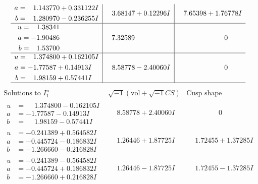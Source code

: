 \documentclass[1p]{elsarticle_modified}
\theoremstyle{definition}
\newcommand{\I}{\sqrt{-1}}
\begin{document}
$$\begin{array}{c|c|c}
\begin{aligned}
a &= \phantom{-}1.143770 + 0.331122 I \\
b &= \phantom{-}1.280970 - 0.236255 I\end{aligned}
 & \phantom{-}3.68147 + 0.12296 I & \phantom{-}7.65398 + 1.76778 I \\ \hline\begin{aligned}
u &= \phantom{-}1.38341\phantom{ +0.000000I} \\
a &= -1.90486\phantom{ +0.000000I} \\
b &= \phantom{-}1.53700\phantom{ +0.000000I}\end{aligned}
 & \phantom{-}7.32589\phantom{ +0.000000I} & \phantom{-0.000000 } 0 \\ \hline\begin{aligned}
u &= \phantom{-}1.374800 + 0.162105 I \\
a &= -1.77587 + 0.14913 I \\
b &= \phantom{-}1.98159 + 0.57441 I\end{aligned}
 & \phantom{-}8.58778 - 2.40060 I & \phantom{-0.000000 } 0\\
 \hline 
 \end{array}$$\newpage$$\begin{array}{c|c|c}  
\text{Solutions to }I^u_{1}& \I (\text{vol} + \sqrt{-1}CS) & \text{Cusp shape}\\
 \hline 
\begin{aligned}
u &= \phantom{-}1.374800 - 0.162105 I \\
a &= -1.77587 - 0.14913 I \\
b &= \phantom{-}1.98159 - 0.57441 I\end{aligned}
 & \phantom{-}8.58778 + 2.40060 I & \phantom{-0.000000 } 0 \\ \hline\begin{aligned}
u &= -0.241389 + 0.564582 I \\
a &= -0.445724 - 0.186832 I \\
b &= -1.266660 - 0.216828 I\end{aligned}
 & \phantom{-}1.26446 + 1.87725 I & \phantom{-}1.72455 + 1.37285 I \\ \hline\begin{aligned}
u &= -0.241389 - 0.564582 I \\
a &= -0.445724 + 0.186832 I \\
b &= -1.266660 + 0.216828 I\end{aligned}
 & \phantom{-}1.26446 - 1.87725 I & \phantom{-}1.72455 - 1.37285 I \\ \hline\begin{aligned}

\end{aligned}
\end{array}$$
\end{document}
